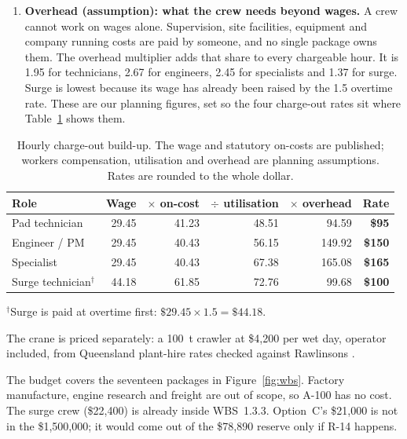 \begin{enumerate}[leftmargin=1.6em,itemsep=0.35em]
\item \textbf{Overhead (assumption): what the crew needs beyond wages.} A crew cannot work on wages alone. Supervision, site facilities, equipment and company running costs are paid by someone, and no single package owns them. The overhead multiplier adds that share to every chargeable hour. It is 1.95 for technicians, 2.67 for engineers, 2.45 for specialists and 1.37 for surge. Surge is lowest because its wage has already been raised by the 1.5 overtime rate. These are our planning figures, set so the four charge-out rates sit where Table~\ref{tab:labour-rates} shows them.
\end{enumerate}

\begin{table}[H]
\centering
\small
\caption[Hourly charge-out build-up]{Hourly charge-out build-up. The wage and statutory on-costs are published; workers compensation, utilisation and overhead are planning assumptions. Rates are rounded to the whole dollar.}
\label{tab:labour-rates}
\begin{tabular}{@{}lrrrrr@{}}
\toprule
Role & Wage & $\times$ on-cost & $\div$ utilisation & $\times$ overhead & Rate \\
\midrule
Pad technician & 29.45 & 41.23 & 48.51 & 94.59 & \textbf{\$95} \\
Engineer / PM & 29.45 & 40.43 & 56.15 & 149.92 & \textbf{\$150} \\
Specialist & 29.45 & 40.43 & 67.38 & 165.08 & \textbf{\$165} \\
Surge technician$^{\dagger}$ & 44.18 & 61.85 & 72.76 & 99.68 & \textbf{\$100} \\
\bottomrule
\end{tabular}

\vspace{0.2em}
{\footnotesize $^{\dagger}$Surge is paid at overtime first: $\$29.45 \times 1.5 = \$44.18$.}
\end{table}

The crane is priced separately: a 100~t crawler at \$4{,}200 per wet day, operator included, from Queensland plant-hire rates checked against Rawlinsons \citep{rawlinsons2025}.

The budget covers the seventeen packages in Figure~\ref{fig:wbs}. Factory manufacture, engine research and freight are out of scope, so A-100 has no cost. The surge crew (\$22{,}400) is already inside WBS~1.3.3. Option~C's \$21{,}000 is not in the \$1{,}500{,}000; it would come out of the \$78{,}890 reserve only if R-14 happens.

